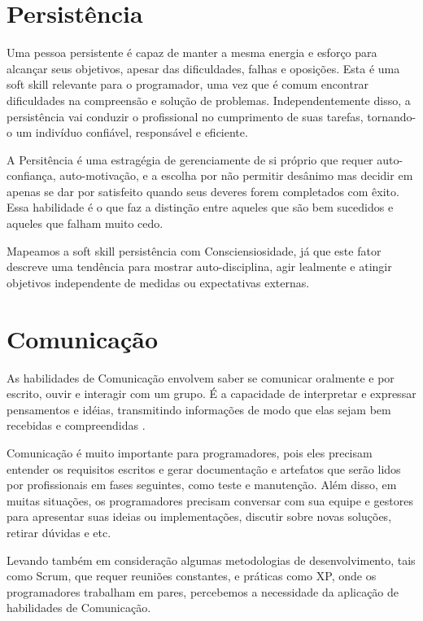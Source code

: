 \section{Persistência}

Uma pessoa persistente é capaz de manter a mesma energia e esforço para alcançar seus objetivos, apesar das dificuldades, falhas e oposições. Esta é uma soft skill relevante para o programador, uma vez que é comum encontrar dificuldades na compreensão e solução de problemas. Independentemente disso, a persistência vai conduzir o profissional no cumprimento de suas tarefas, tornando-o um indivíduo confiável, responsável e  eficiente.

A Persitência é uma estragégia de gerenciamente de si próprio que requer auto-confiança, auto-motivação, e a escolha por não permitir desânimo mas decidir em apenas se dar por satisfeito  quando seus deveres forem completados com êxito. Essa habilidade é o que faz a distinção entre aqueles que são bem sucedidos e aqueles que falham muito cedo.

Mapeamos a soft skill persistência com Consciensiosidade, já que este fator descreve uma tendência para mostrar auto-disciplina, agir lealmente e atingir objetivos independente de medidas ou expectativas externas.

\section{Comunicação}

As habilidades de Comunicação envolvem saber se comunicar oralmente e por escrito, ouvir e interagir com um grupo. É a capacidade de  interpretar e expressar pensamentos e idéias, transmitindo informações de modo que elas sejam bem recebidas e compreendidas \cite{ahmed:12}.

Comunicação é muito importante para programadores, pois eles precisam entender os requisitos escritos e gerar documentação e artefatos que serão lidos por profissionais em fases seguintes, como teste e manutenção. Além disso, em muitas situações, os programadores precisam conversar com sua equipe e gestores para apresentar suas ideias ou implementações, discutir sobre novas soluções, retirar dúvidas e etc.

Levando também em consideração algumas metodologias de desenvolvimento, tais como Scrum, que requer reuniões constantes, e práticas como XP, onde os programadores trabalham em pares, percebemos a necessidade da aplicação de habilidades de Comunicação. 

